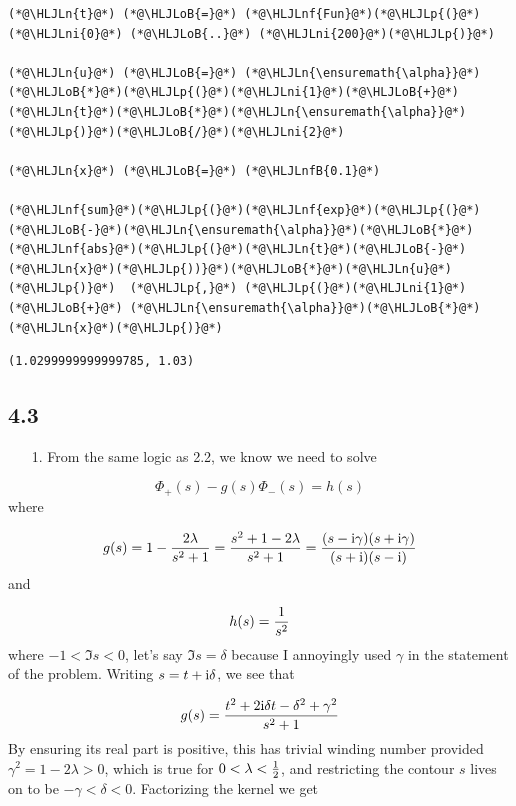 \documentclass[12pt,a4paper]{article}
\newcommand{\HLJLn}[1]{#1}
\newcommand{\HLJLnf}[1]{\textcolor[RGB]{66,102,213}{#1}}
\newcommand{\HLJLnfB}[1]{\textcolor[RGB]{59,151,46}{#1}}
\newcommand{\HLJLni}[1]{\textcolor[RGB]{59,151,46}{#1}}
\newcommand{\HLJLoB}[1]{\textcolor[RGB]{102,102,102}{\textbf{#1}}}
\newcommand{\HLJLp}[1]{#1}
\def\I{ {\rm i} }
\begin{document}
\begin{lstlisting}
(*@\HLJLn{t}@*) (*@\HLJLoB{=}@*) (*@\HLJLnf{Fun}@*)(*@\HLJLp{(}@*)(*@\HLJLni{0}@*) (*@\HLJLoB{..}@*) (*@\HLJLni{200}@*)(*@\HLJLp{)}@*)

(*@\HLJLn{u}@*) (*@\HLJLoB{=}@*) (*@\HLJLn{\ensuremath{\alpha}}@*)(*@\HLJLoB{*}@*)(*@\HLJLp{(}@*)(*@\HLJLni{1}@*)(*@\HLJLoB{+}@*)(*@\HLJLn{t}@*)(*@\HLJLoB{*}@*)(*@\HLJLn{\ensuremath{\alpha}}@*)(*@\HLJLp{)}@*)(*@\HLJLoB{/}@*)(*@\HLJLni{2}@*)

(*@\HLJLn{x}@*) (*@\HLJLoB{=}@*) (*@\HLJLnfB{0.1}@*)

(*@\HLJLnf{sum}@*)(*@\HLJLp{(}@*)(*@\HLJLnf{exp}@*)(*@\HLJLp{(}@*)(*@\HLJLoB{-}@*)(*@\HLJLn{\ensuremath{\alpha}}@*)(*@\HLJLoB{*}@*)(*@\HLJLnf{abs}@*)(*@\HLJLp{(}@*)(*@\HLJLn{t}@*)(*@\HLJLoB{-}@*)(*@\HLJLn{x}@*)(*@\HLJLp{))}@*)(*@\HLJLoB{*}@*)(*@\HLJLn{u}@*)(*@\HLJLp{)}@*)  (*@\HLJLp{,}@*) (*@\HLJLp{(}@*)(*@\HLJLni{1}@*) (*@\HLJLoB{+}@*) (*@\HLJLn{\ensuremath{\alpha}}@*)(*@\HLJLoB{*}@*)(*@\HLJLn{x}@*)(*@\HLJLp{)}@*)
\end{lstlisting}

\begin{lstlisting}
(1.0299999999999785, 1.03)
\end{lstlisting}


\subsection{4.3}
\begin{itemize}
\item[1. ] From the same logic as 2.2, we know we need to solve

\end{itemize}
\[
\Phi_+(s) - g(s) \Phi_-(s) = h(s)
\]
where

\[
g(s) = 1 - {2 \lambda \over s^2 + 1} = {s^2 +1-2 \lambda \over s^2 + 1} = {(s- \I\gamma)(s+\I \gamma) \over (s+\I)(s-\I)}
\]
and 

\[
h(s) = {1 \over s^2}
\]
where $-1 < \Im s  < 0$, let's say $\Im s  = \delta$ because I annoyingly used $\gamma$ in the statement of the problem.  Writing $s = t + \I \delta$, we see that

\[
g(s) =  {t^2 +2 \I \delta t -\delta^2 +\gamma^2 \over s^2 + 1}
\]
By ensuring its real part is positive, this has trivial winding number provided $\gamma^2 = 1 - 2\lambda > 0$, which is true for $0 < \lambda < {1 \over 2}$, and restricting the contour $s$ lives on to be $- {\gamma} < \delta < 0$. Factorizing the kernel we get
\end{document}
